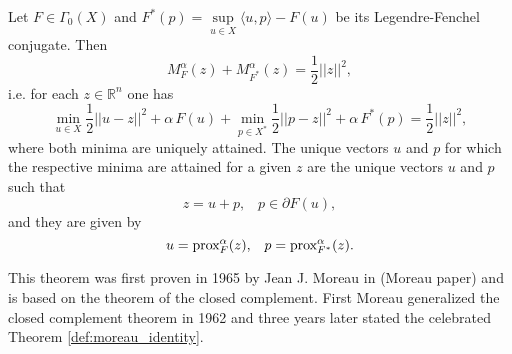     \begin{theorem} %
    \label{def:moreau_identity}

        Let $F \in \Gamma_{0}(X)$ and $F^{\ast}(p) = \sup\limits_{u \in X} \langle u, p \rangle - F(u)$ be its Legendre-Fenchel conjugate. Then
            \begin{equation}
                M^{\alpha}_{F}(z) + M^{\alpha}_{F^{\ast}}(z) = \frac{1}{2}||z||^{2},
            \end{equation}
        i.e. for each $z \in \mathbb{R}^{n}$ one has
            \begin{equation}
                \min_{u \in X} \frac{1}{2} ||u - z||^{2} +  \alpha \, F(u) + \min_{p \in X^{\ast}} \frac{1}{2} ||p - z||^{2} +  \alpha \, F^{\ast}(p) = \frac{1}{2}||z||^{2},
                \label{eq:moreau_identity}
            \end{equation}
        where both minima are uniquely attained. The unique vectors $u$ and $p$ for which the respective minima are attained for a given $z$ are the unique vectors $u$ and $p$ such that
            \begin{equation}
                z = u + p, \,\,\,\,\, p \in \partial F(u), \label{eq:equivalence_of_moreau_property}
            \end{equation}
        and they are given by
            \begin{equation}
                u = \textnormal{prox}^{\alpha}_{F}(z), \,\,\,\,\, p = \textnormal{prox}^{\alpha}_{F^{\ast}}(z).
            \end{equation}
    \end{theorem}

    This theorem was first proven in 1965 by Jean J. Moreau in (Moreau paper) and is based on the theorem of the closed complement. First Moreau generalized the closed complement theorem in 1962 and three years later stated the celebrated Theorem \ref{def:moreau_identity}.

